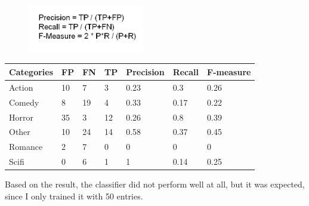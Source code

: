 \documentclass[12pt]{article}
\begin{document}
\begin{figure}[h!]
\centering
\includegraphics[width=2in]{formulas.png}
\end{figure}

\begin{center}
\begin{tabular}{ | m{0.8in} | m{0.3in}| m{0.3in} | m{0.3in} | m{0.8in} | m{0.5in} | m{1in} |} 
\hline
Categories & FP & FN & TP & Precision & Recall & F-measure \\
\hline
Action & 10 & 7 & 3 & 0.23 & 0.3 & 0.26 \\ 
\hline
Comedy & 8 & 19 & 4 & 0.33 & 0.17 & 0.22 \\ 
\hline
Horror & 35 & 3 & 12 & 0.26 & 0.8 & 0.39 \\ 
\hline
Other & 10 & 24 & 14 & 0.58 & 0.37 & 0.45 \\ 
\hline
Romance & 2 & 7 & 0 & 0 & 0 & 0 \\ 
\hline
Scifi & 0 & 6 & 1 & 1 & 0.14 & 0.25 \\ 
\hline
\end{tabular}
\end{center}

Based on the result, the classifier did not perform well at all, but it was expected, since I only trained it with 50 entries.
\end{document}
